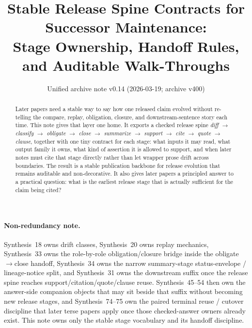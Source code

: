 \documentclass[11pt]{article}
\title{Stable Release Spine Contracts for Successor Maintenance:\\[0.5ex]
\large Stage Ownership, Handoff Rules, and Auditable Walk-Throughs}
\author{}
\date{Unified archive note v0.14 (2026-03-19; archive v400)}
\begin{document}
\maketitle

\begin{abstract}
Later papers need a stable way to say how one released claim evolved without re-telling the compare, replay, obligation, closure, and downstream-sentence story each time.
This note gives that layer one home.
It exports a checked release spine
\emph{diff $\to$ classify $\to$ obligate $\to$ close $\to$ summarize $\to$ support $\to$ cite $\to$ quote $\to$ clause},
together with one tiny contract for each stage: what inputs it may read, what output family it owns, what kind of assertion it is allowed to support, and when later notes must cite that stage directly rather than let wrapper prose drift across boundaries.
The result is a stable publication backbone for release evolution that remains auditable and non-decorative.
It also gives later papers a principled answer to a practical question: what is the earliest release stage that is actually sufficient for the claim being cited?
\end{abstract}

\paragraph{Non-redundancy note.}
Synthesis~18 owns drift classes, Synthesis~20 owns replay mechanics, Synthesis~33 owns the role-by-role obligation/closure bridge inside the obligate$\to$close handoff, Synthesis~34 owns the narrow summary-stage status-envelope / lineage-notice split, and Synthesis~31 owns the downstream suffix once the release spine reaches support/citation/quote/clause reuse. Synthesis~45--54 then own the answer-side companion objects that may sit beside that suffix without becoming new release stages, and Synthesis~74--75 own the paired terminal reuse / cutover discipline that later terse papers apply once those checked-answer owners already exist.\cite{series:challengeanswercapsules,series:challengeanswersheets,series:challengeanswercards,series:challengeanswercarrierslots,series:challengeansweraudittrails,series:challengeanswercitationdockets,series:challengeanswerpublicationprofiles,series:challengeanswerdisclosurepackets,series:challengeanswerescalationladders,series:challengeanswerreviewmenus,series:pairedterminalcitationdiscipline,series:pairedterminalcutoverrules}
This note owns only the stable stage vocabulary and its handoff discipline.
\end{document}
